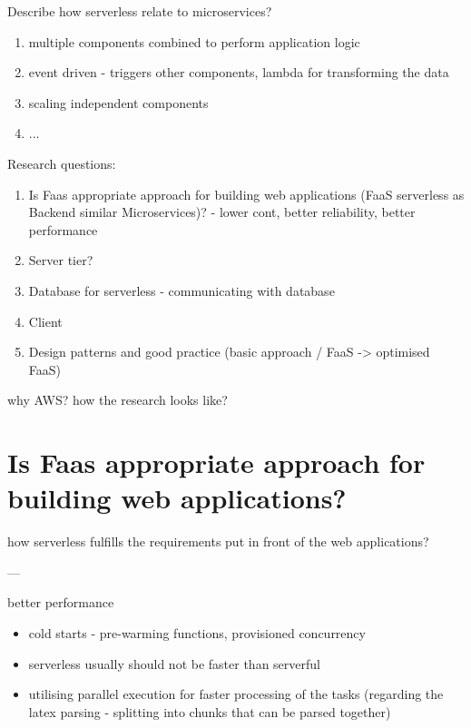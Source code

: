 
Describe how serverless relate to microservices?

\begin{enumerate}
    \item multiple components combined to perform application logic
    \item event driven - triggers other components, lambda for transforming the data
    \item scaling independent components
    \item ...
\end{enumerate}

Research questions:

\begin{enumerate}
    \item Is Faas appropriate approach for building web applications (FaaS serverless as Backend similar Microservices)? - lower cont, better reliability, better performance
    \item Server tier?
    \item Database for serverless - communicating with database
    \item Client
    \item Design patterns and good practice (basic approach / FaaS -> optimised FaaS)
\end{enumerate}

why AWS? how the research looks like?

\section{Is Faas appropriate approach for building web applications?}

how serverless fulfills the requirements put in front of the web applications?

---

better performance

\begin{itemize}
    \item cold starts - pre-warming functions, provisioned concurrency
    \item serverless usually should not be faster than serverful
    \item utilising parallel execution for faster processing of the tasks (regarding the latex parsing - splitting into chunks that can be parsed together)
\end{itemize}

